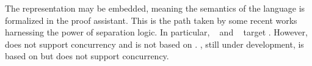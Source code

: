 The representation may be embedded, meaning the semantics of the language is formalized in the proof assistant.
This is the path taken by some recent works~\cite{DBLP:books/hal/Chargueraud23, DBLP:journals/pacmpl/GondelmanHPTB23, DBLP:conf/sosp/ChajedTKZ19,osiris} harnessing the power of separation logic.
In particular, \CFML~\cite{DBLP:books/hal/Chargueraud23} and \Osiris~\cite{osiris} target \OCaml.
However, \CFML does not support concurrency and is not based on \Iris.
\Osiris, still under development, is based on \Iris but does not support concurrency.
